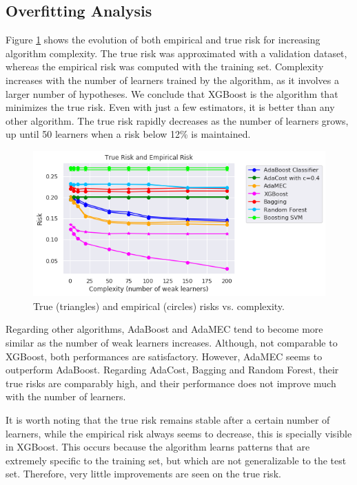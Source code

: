 \documentclass[conference]{IEEEtran}
\begin{document}
\subsection{Overfitting Analysis}

Figure \ref{fig:True_empirical_risk_complexity} shows the evolution of both empirical and true risk for increasing algorithm complexity. The true risk was approximated with a validation dataset, whereas the empirical risk was computed with the training set. Complexity increases with the number of learners trained by the algorithm, as it involves a larger number of hypotheses. We conclude that XGBoost is the algorithm that minimizes the true risk. Even with just a few estimators, it is better than any other algorithm. The true risk rapidly decreases as the number of learners grows, up until 50 learners when a risk below 12\% is maintained.

\begin{figure}
	\includegraphics[scale=0.45]{True_empirical_risk_complexity}
	\centering
	\caption{True (triangles) and empirical (circles) risks vs. complexity.}
	\label{fig:True_empirical_risk_complexity}
\end{figure}

Regarding other algorithms, AdaBoost and AdaMEC tend to become more similar as the number of weak learners increases. Although, not comparable to XGBoost, both performances are satisfactory. However, AdaMEC seems to outperform AdaBoost. Regarding AdaCost, Bagging and Random Forest, their true risks are comparably high, and their performance does not improve much with the number of learners.

It is worth noting that the true risk remains stable after a certain number of learners, while the empirical risk always seems to decrease, this is specially visible in XGBoost. This occurs because the algorithm learns patterns that are extremely specific to the training set, but which are not generalizable to the test set. Therefore, very little improvements are seen on the true risk. %
\end{document}
